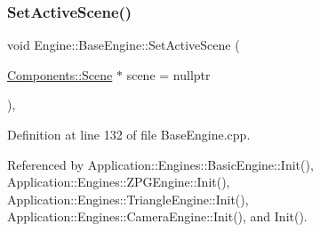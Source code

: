 \subsubsection{\texorpdfstring{Set\+Active\+Scene()}{SetActiveScene()}}
{\footnotesize\ttfamily void Engine\+::\+Base\+Engine\+::\+Set\+Active\+Scene (\begin{DoxyParamCaption}\item[{\mbox{\hyperlink{classEngine_1_1Components_1_1Scene}{Components\+::\+Scene}} $\ast$}]{scene = {\ttfamily nullptr} }\end{DoxyParamCaption})\hspace{0.3cm}{\ttfamily [virtual]}, {\ttfamily [inherited]}}



Definition at line 132 of file Base\+Engine.\+cpp.



Referenced by Application\+::\+Engines\+::\+Basic\+Engine\+::\+Init(), Application\+::\+Engines\+::\+Z\+P\+G\+Engine\+::\+Init(), Application\+::\+Engines\+::\+Triangle\+Engine\+::\+Init(), Application\+::\+Engines\+::\+Camera\+Engine\+::\+Init(), and Init().


